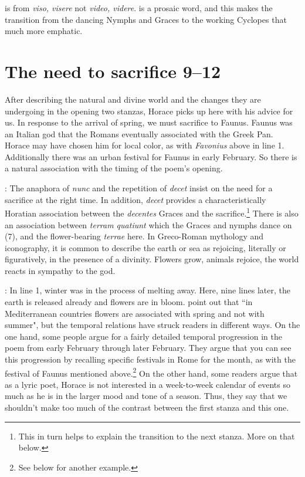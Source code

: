  is from \textit{viso, visere} not \textit{video, videre}.\indent{} is a prosaic word, and this makes the transition from the dancing Nymphs and Graces to the working Cyclopes that much more emphatic.


\section*{The need to sacrifice 9--12}

After describing the natural and divine world and the changes they are undergoing in the opening two stanzas, Horace picks up here with his advice for us.  In response to the arrival of spring, we must sacrifice to Faunus.  Faunus was an Italian god that the Romans eventually associated with the Greek Pan.  Horace may have chosen him for local color, as with \textit{Favonius} above in line 1. Additionally there was an urban festival for Faunus in early February.  So there is a natural association with the timing of the poem's opening.


: The anaphora of \textit{nunc} and the repetition of \textit{decet} insist on the need for a sacrifice at the right time.  In addition, \textit{decet} provides a characteristically Horatian association between the \textit{decentes} Graces and the sacrifice.\footnote{This in turn helps to explain the transition to the next stanza.  More on that below.}  There is also an association between \textit{terram quatiunt} which the Graces and nymphs dance on (7), and the flower-bearing \textit{terrae} here.  In Greco-Roman mythology and iconography, it is common to describe the earth or sea as rejoicing, literally or figuratively, in the presence of a divinity.  Flowers grow, animals rejoice, the world reacts in sympathy to the god.


: In line 1, winter was in the process of melting away.  Here, nine lines later, the earth is released already and flowers are in bloom.  \citet[66]{nh1989} point out that ``in Mediterranean countries flowers are associated with spring and not with summer", but the temporal relations have struck readers in different ways.  On the one hand, some people argue for a fairly detailed temporal progression in the poem from early February through later February.  They argue that you can see this progression by recalling specific festivals in Rome for the month, as with the festival of Faunus mentioned above.\footnote{See below for another example.}  On the other hand, some readers argue that as a lyric poet, Horace is not interested in a week-to-week calendar of events so much as he is in the larger mood and tone of a season.  Thus, they say that we shouldn't make too much of the contrast between the first stanza and this one.

